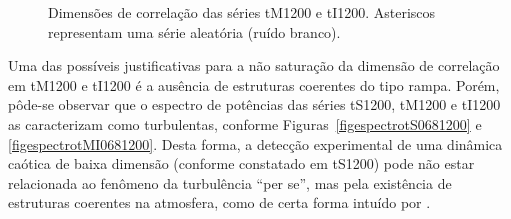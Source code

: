 \begin{figure}[ht]
\centering {}
\caption{Dimensões de correlação das séries tM1200 e tI1200. Asteriscos representam uma série aleatória (ruído branco).}
\label{figdimcorreltMI0681200}
\end{figure}

Uma das possíveis justificativas para a não saturação da dimensão de correlação em tM1200 e tI1200 é a ausência de estruturas coerentes do tipo rampa. Porém, pôde-se observar que o espectro de potências das séries tS1200, tM1200 e tI1200 as caracterizam como turbulentas, conforme Figuras~\ref{figespectrotS0681200} e \ref{figespectrotMI0681200}. Desta forma, a detecção experimental de uma dinâmica caótica de baixa dimensão (conforme constatado em tS1200) pode não estar relacionada ao fenômeno da turbulência ``per se'', mas pela existência de estruturas coerentes na atmosfera, como de certa forma intuído por .